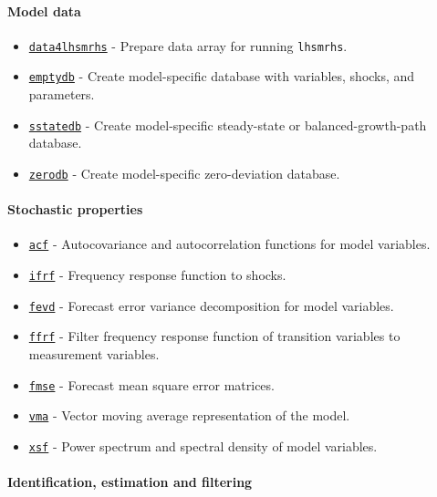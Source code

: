 \paragraph{Model data}

\begin{itemize}
\itemsep1pt\parskip0pt
\item
  \href{model/data4lhsmrhs}{\texttt{data4lhsmrhs}} - Prepare data array
  for running \texttt{lhsmrhs}.
\item
  \href{model/emptydb}{\texttt{emptydb}} - Create model-specific
  database with variables, shocks, and parameters.
\item
  \href{model/sstatedb}{\texttt{sstatedb}} - Create model-specific
  steady-state or balanced-growth-path database.
\item
  \href{model/zerodb}{\texttt{zerodb}} - Create model-specific
  zero-deviation database.
\end{itemize}

\paragraph{Stochastic properties}

\begin{itemize}
\itemsep1pt\parskip0pt
\item
  \href{model/acf}{\texttt{acf}} - Autocovariance and autocorrelation
  functions for model variables.
\item
  \href{model/ifrf}{\texttt{ifrf}} - Frequency response function to
  shocks.
\item
  \href{model/fevd}{\texttt{fevd}} - Forecast error variance
  decomposition for model variables.
\item
  \href{model/ffrf}{\texttt{ffrf}} - Filter frequency response function
  of transition variables to measurement variables.
\item
  \href{model/fmse}{\texttt{fmse}} - Forecast mean square error
  matrices.
\item
  \href{model/vma}{\texttt{vma}} - Vector moving average representation
  of the model.
\item
  \href{model/xsf}{\texttt{xsf}} - Power spectrum and spectral density
  of model variables.
\end{itemize}

\paragraph{Identification, estimation and
filtering}

